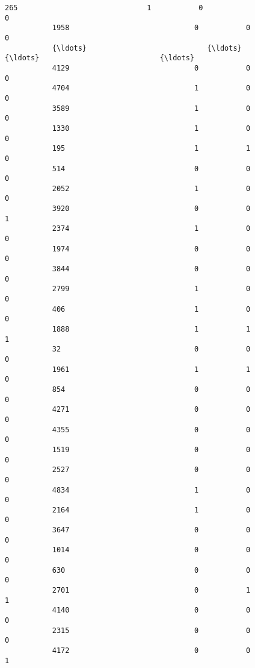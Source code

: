 \documentclass[11pt]{article}
\begin{document}
\begin{Verbatim}[commandchars=\\\{\}]
           265                              1           0                              0   
           1958                             0           0                              0   
           {\ldots}                            {\ldots}         {\ldots}                            {\ldots}   
           4129                             0           0                              0   
           4704                             1           0                              0   
           3589                             1           0                              0   
           1330                             1           0                              0   
           195                              1           1                              0   
           514                              0           0                              0   
           2052                             1           0                              0   
           3920                             0           0                              1   
           2374                             1           0                              0   
           1974                             0           0                              0   
           3844                             0           0                              0   
           2799                             1           0                              0   
           406                              1           0                              0   
           1888                             1           1                              1   
           32                               0           0                              0   
           1961                             1           1                              0   
           854                              0           0                              0   
           4271                             0           0                              0   
           4355                             0           0                              0   
           1519                             0           0                              0   
           2527                             0           0                              0   
           4834                             1           0                              0   
           2164                             1           0                              0   
           3647                             0           0                              0   
           1014                             0           0                              0   
           630                              0           0                              0   
           2701                             0           1                              1   
           4140                             0           0                              0   
           2315                             0           0                              0   
           4172                             0           0                              1   
           

\end{Verbatim}
\end{document}
